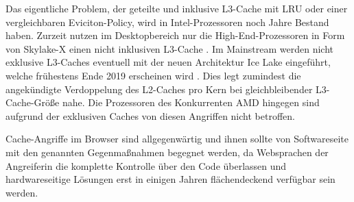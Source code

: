 Das eigentliche Problem, der geteilte und inklusive L3-Cache mit LRU oder einer vergleichbaren Eviciton-Policy, wird in Intel-Prozessoren noch Jahre Bestand haben.
Zurzeit nutzen im Desktopbereich nur die High-End-Prozessoren in Form von Skylake-X einen nicht inklusiven L3-Cache \cite{SkylakeXL3Cache}.
Im Mainstream werden nicht exklusive L3-Caches eventuell mit der neuen Architektur Ice Lake eingeführt, welche frühestens Ende 2019 erscheinen wird \cite{IceLakeReleaseDate}.
Dies legt zumindest die angekündigte Verdoppelung des L2-Caches pro Kern bei gleichbleibender L3-Cache-Größe nahe.
Die Prozessoren des Konkurrenten AMD hingegen sind aufgrund der exklusiven Caches \cite{CacheRyzen} von diesen Angriffen nicht betroffen.

Cache-Angriffe im Browser sind allgegenwärtig und ihnen sollte von Softwareseite mit den genannten Gegenmaßnahmen begegnet werden, da Websprachen der Angreiferin die komplette Kontrolle über den Code überlassen und hardwareseitige Lösungen erst in einigen Jahren flächendeckend verfügbar sein werden.




